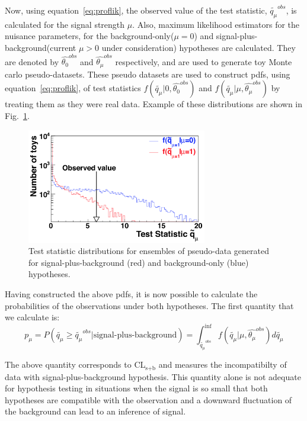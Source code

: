 Now, using equation~\ref{eq:proflik}, the observed value of the test statistic, $\tilde{q_\mu}^{obs}$, is calculated for the signal strength $\mu$. Also, maximum likelihood estimators for the nuisance parameters, for the background-only($\mu=0$) and signal-plus-background(current $\mu>0$ under consideration) hypotheses are calculated. They are denoted by $\hat{\theta_{0}}^{obs}$ and $\hat{\theta_\mu}^{obs}$ respectively, and are used to generate toy Monte carlo pseudo-datasets. These pseudo datasets are used to construct  pdfs, using equation~\ref{eq:proflik}, of test statistics $f(\tilde{q_\mu}|0,\hat{\theta_{0}}^{obs})$ and $f(\tilde{q_\mu}|\mu,\hat{\theta_\mu}^{obs})$ by treating them as they were real data. Example of these distributions are shown in Fig.~\ref{fig:test_stat_dist}.
\begin{figure}[!htpb]\centering
 \includegraphics[width=0.70\textwidth]{plots_and_figures/chapter7/test_statistic_distri.png}
 \caption{Test statistic distributions for ensembles of pseudo-data generated for signal-plus-background (red) and background-only (blue) hypotheses.~\cite{note2011}}
 \label{fig:test_stat_dist}
\end{figure}


Having constructed the above pdfs, it is now possible to calculate the probabilities of the observations under both hypotheses. The first quantity that we calculate is:
\begin{equation}                                                                                                                                                                                                 \label{eq:pmu}                                                       p_\mu=P(\tilde{q_\mu}\geq \tilde{q_\mu}^{obs}|\text{signal-plus-background})=\int_{\tilde{q_\mu}^{obs}}^{\inf}f(\tilde{q_\mu}|\mu,\hat{\theta_\mu}^{obs})d\tilde{q_\mu}
\end{equation}

The above quantity corresponds to CL$_\text{s+b}$ and measures the incompatibilty of data with signal-plus-background hypothesis. This quantity alone is not adequate for hypothesis testing in situations when the signal is so small that both hypotheses are compatible with the observation and a downward fluctuation of the background can lead to an inference of signal.

